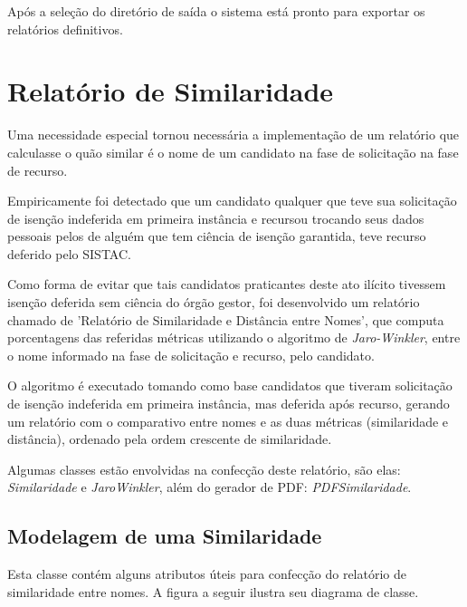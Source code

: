 \documentclass[
	12pt,			%
	openright,		%
	oneside,	
	a4paper,		%
	english,		%
	brazil			%
]{abntex2/abntex2}  %
\begin{document}
					Após a seleção do diretório de saída o sistema está pronto para exportar os relatórios definitivos.

		\section{Relatório de Similaridade} \label{similaridade}
		
			Uma necessidade especial tornou necessária a implementação de um relatório que calculasse o quão similar é o nome de um candidato na fase de solicitação na fase de recurso.
			
			Empiricamente foi detectado que um candidato qualquer que teve sua solicitação de isenção indeferida em primeira instância e recursou trocando seus dados pessoais pelos de alguém que tem ciência de isenção garantida, teve recurso deferido pelo SISTAC.
			
			Como forma de evitar que tais candidatos praticantes deste ato ilícito tivessem isenção deferida sem ciência do órgão gestor, foi desenvolvido um relatório chamado de 'Relatório de Similaridade e Distância entre Nomes', que computa porcentagens das referidas métricas utilizando o algoritmo de \textit{Jaro-Winkler}, entre o nome informado na fase de solicitação e recurso, pelo candidato.
			
			O algoritmo é executado tomando como base candidatos que tiveram solicitação de isenção indeferida em primeira instância, mas deferida após recurso, gerando um relatório com o comparativo entre nomes e as duas métricas (similaridade e distância), ordenado pela ordem crescente de similaridade.
			
			Algumas classes estão envolvidas na confecção deste relatório, são elas: \textit{Similaridade} e \textit{JaroWinkler}, além do gerador de PDF: \textit{PDFSimilaridade}.
			
			\subsection{Modelagem de uma Similaridade}
			
				Esta classe contém alguns atributos úteis para confecção do relatório de similaridade entre nomes. A figura a seguir ilustra seu diagrama de classe.
				
\end{document}
